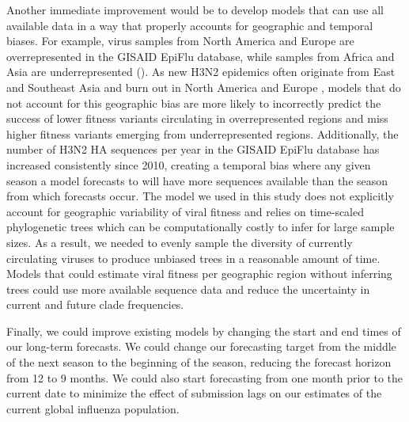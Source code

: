 \documentclass[9pt,lineno]{elife}
\begin{document}
Another immediate improvement would be to develop models that can use all available data in a way that properly accounts for geographic and temporal biases.
For example, virus samples from North America and Europe are overrepresented in the GISAID EpiFlu database, while samples from Africa and Asia are underrepresented ().
As new H3N2 epidemics often originate from East and Southeast Asia and burn out in North America and Europe \citep{Bedford2015}, models that do not account for this geographic bias are more likely to incorrectly predict the success of lower fitness variants circulating in overrepresented regions and miss higher fitness variants emerging from underrepresented regions.
Additionally, the number of H3N2 HA sequences per year in the GISAID EpiFlu database has increased consistently since 2010, creating a temporal bias where any given season a model forecasts to will have more sequences available than the season from which forecasts occur.
The model we used in this study does not explicitly account for geographic variability of viral fitness and relies on time-scaled phylogenetic trees which can be computationally costly to infer for large sample sizes.
As a result, we needed to evenly sample the diversity of currently circulating viruses to produce unbiased trees in a reasonable amount of time.
Models that could estimate viral fitness per geographic region without inferring trees could use more available sequence data and reduce the uncertainty in current and future clade frequencies.

Finally, we could improve existing models by changing the start and end times of our long-term forecasts.
We could change our forecasting target from the middle of the next season to the beginning of the season, reducing the forecast horizon from 12 to 9 months.
We could also start forecasting from one month prior to the current date to minimize the effect of submission lags on our estimates of the current global influenza population.
\end{document}

